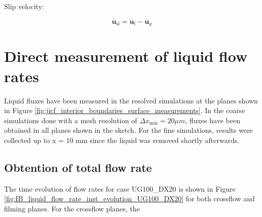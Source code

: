 Slip velocity:

\begin{equation}
\overline{\textbf{u}}_{\mathrm{sl}} = \overline{\textbf{u}}_l - \overline{\textbf{u}}_g
\end{equation}


\section{Direct measurement of liquid flow rates}

Liquid fluxes have been measured in the resolved simulations at the planes shown in Figure \ref{fig:jicf_interior_boundaries_surface_measurements}. In the coarse simulations done with a mesh resolution of $\Delta x_\mathrm{min} = 20 \mu m$, fluxes have been obtained in all planes shown in the sketch. For the fine simulations, results were collected up to x = 10 mm since the liquid was removed shortly afterwards.

\subsection{Obtention of total flow rate}

The time evolution of flow rates for case UG100\_DX20 is shown in Figure \ref{fig:IB_liquid_flow_rate_inst_evolution_UG100_DX20} for both crossflow and filming planes. For the crossflow planes, the 


